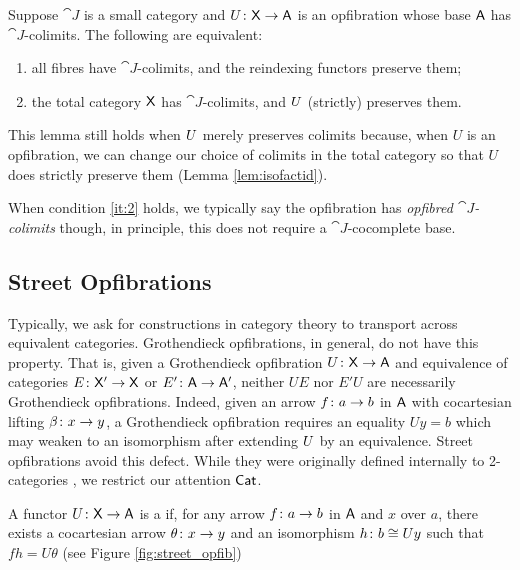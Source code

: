 \documentclass{amsart}
\begin{document}
\begin{lem}\label{lem:fibrewiselimits}
  Suppose $\cat{J}$ is a small category and $U\colon\mathsf{X}\to\mathsf{A}$ is an
  opfibration whose base $\mathsf{A}$ has $\cat{J}$-colimits. The following
  are equivalent:
\begin{enumerate}
 \item all fibres have $\cat{J}$-colimits, and the reindexing functors preserve them; \label{it:2}
 \item the total category $\mathsf{X}$ has $\cat{J}$-colimits, and $U$ (strictly) preserves them.
\end{enumerate}
\end{lem}

\begin{remark}
  This lemma still holds when $U$ merely preserves colimits because, when $U$ is an opfibration, we can change our choice of colimits in the total category so that $U$ does strictly preserve them (Lemma \ref{lem:isofactid}).
\end{remark}

When condition \ref{it:2} holds, we typically say the opfibration has
\emph{opfibred $\cat{J}$-colimits} though, in principle, this does not
require a $\cat{J}$-cocomplete base.

\subsection{Street Opfibrations} %

Typically, we ask for constructions in category theory to transport
across equivalent categories. Grothendieck opfibrations, in general,
do not have this property. That is, given a Grothendieck opfibration
$U \colon \mathsf{X} \to \mathsf{A}$ and equivalence of categories $E \colon \mathsf{X}' \to \mathsf{X}$
or $E' \colon \mathsf{A} \to \mathsf{A}'$, neither $UE$ nor $E'U$ are necessarily
Grothendieck opfibrations.  Indeed, given an arrow $f \colon a \to b$
in $\mathsf{A}$ with cocartesian lifting $\beta \colon x \to y$, a Grothendieck
opfibration requires an equality $Uy=b$ which may weaken to an
isomorphism after extending $U$ by an equivalence. Street
opfibrations avoid this defect. While they were originally defined
internally to 2-categories \cite{FibYon}, we restrict our attention $\mathsf{Cat}$.

\begin{defn}
  A functor $ U \colon \mathsf{X} \to \mathsf{A} $ is a  if,
  for any arrow $ f \colon a \to b $ in $ \mathsf{A} $ and $ x $ over $ a $,
  there exists a cocartesian arrow $ \theta \colon x \to y $ and an
  isomorphism $ h \colon b \cong Uy $ such that $ fh = U\theta $ (see
  Figure \ref{fig:street_opfib})
\end{defn}
\end{document}
